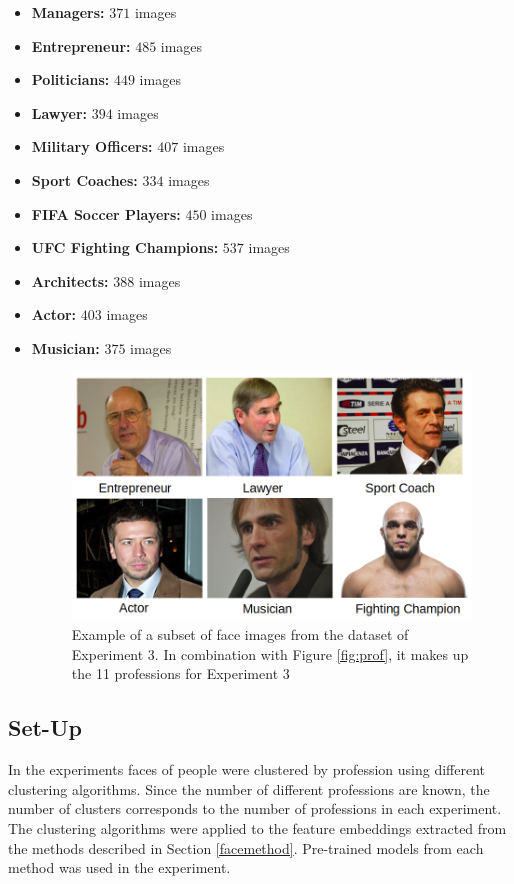 \documentclass[12pt,english]{article}
\begin{document}
\begin{itemize}
\item \textbf{Managers: } $371$ images
\item \textbf{Entrepreneur: } $485$ images
\item \textbf{Politicians: } $449$ images
\item \textbf{Lawyer: } $394$ images
\item \textbf{Military Officers: } $407$ images
\item \textbf{Sport Coaches: } $334$ images
\item \textbf{FIFA Soccer Players: } $450$ images
\item \textbf{UFC Fighting Champions: } $537$ images
\item \textbf{Architects: } $388$ images
\item \textbf{Actor: } $403$ images
\item \textbf{Musician: } $375$ images

\begin{figure}[!tbp]
 \centering
    \includegraphics[width=0.7\columnwidth]{figures/ex3.png}
    \caption{Example of a subset of face images from the dataset of Experiment 3. In combination with Figure \ref{fig:prof}, it makes up the 11 professions for Experiment 3}
\end{figure}

\end{itemize}


\subsection{Set-Up}
\quad
In the experiments faces of people were clustered by profession using different clustering algorithms. Since the number of different professions are known, the number of clusters corresponds to the number of professions in each experiment. The clustering algorithms were applied to the feature embeddings extracted from the methods described in Section \ref{facemethod}. Pre-trained models from each method was used in the experiment. 
\end{document}
